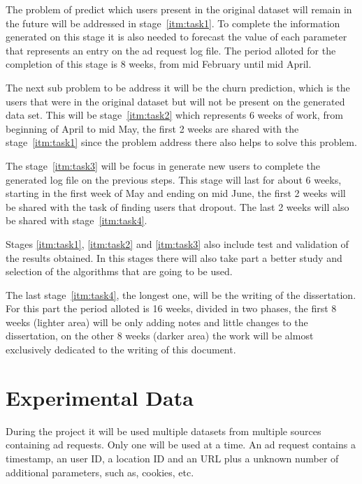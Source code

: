 The problem of predict which users present in the original dataset will remain
in the future will be addressed in stage~\ref{itm:task1}. To complete the
information generated on this stage it is also needed to forecast the value of
each parameter that represents an entry on the ad request log file. The period
alloted for the completion of this stage is 8 weeks, from mid February until mid
April.

The next sub problem to be address it will be the churn prediction, which is the
users that were in the original dataset but will not be present on the generated
data set. This will be stage~\ref{itm:task2} which represents 6 weeks of
work, from beginning of April to mid May,
the first 2 weeks are shared with the stage~\ref{itm:task1} since the problem
address there also helps to solve this problem.

The stage~\ref{itm:task3} will be focus in generate new users to complete the
generated log file on the previous steps. This stage will last for about 6
weeks, starting in the first week of May and ending on mid June, the first 2
weeks will be shared with the task of finding users that dropout. The last 2
weeks will also be shared with stage~\ref{itm:task4}.

Stages \ref{itm:task1}, \ref{itm:task2} and \ref{itm:task3} also include test
and validation of the results obtained. In this stages there will also take part
a better study and selection of the algorithms that are going to be used.

The last stage~\ref{itm:task4}, the longest one, will be the writing of the
dissertation. For this part the period alloted is 16 weeks, divided in two
phases, the first 8 weeks (lighter area) will be only adding notes and little changes to the
dissertation, on the other 8 weeks (darker area) the work will be almost exclusively dedicated
to the writing of this document.




\section{Experimental Data}

During the project it will be used multiple datasets from multiple sources containing ad requests. 
Only one will be used at a time. 
An ad request contains a timestamp, an user ID, a location ID and an URL plus a unknown number of
additional parameters, such as, cookies, etc.

